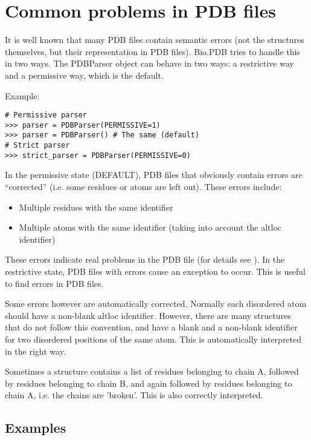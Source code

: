 \section{Common problems in PDB files}

It is well known that many PDB files contain semantic errors (not the
structures themselves, but their representation in PDB files).
Bio.PDB tries to handle this in two ways. The PDBParser
object can behave in two ways: a restrictive way and a permissive
way, which is the default.

Example:

\begin{verbatim}
# Permissive parser
>>> parser = PDBParser(PERMISSIVE=1)
>>> parser = PDBParser() # The same (default)
# Strict parser
>>> strict_parser = PDBParser(PERMISSIVE=0)
\end{verbatim}
In the permissive state (DEFAULT), PDB files that obviously contain
errors are ``corrected'' (i.e. some residues or atoms are left out).
These errors include:

\begin{itemize}
\item Multiple residues with the same identifier
\item Multiple atoms with the same identifier (taking into account the altloc
identifier)
\end{itemize}
These errors indicate real problems in the PDB file (for details see
\cite[Hamelryck and Manderick, 2003]{hamelryck2003a}). In the restrictive state, PDB files with errors cause an exception to occur. This is useful to find errors in PDB files.

Some errors however are automatically corrected. Normally each disordered
atom should have a non-blank altloc identifier. However, there are
many structures that do not follow this convention, and have a blank
and a non-blank identifier for two disordered positions of the same
atom. This is automatically interpreted in the right way.

Sometimes a structure contains a list of residues belonging to chain
A, followed by residues belonging to chain B, and again followed by
residues belonging to chain A, i.e. the chains are 'broken'. This
is also correctly interpreted.

\subsection{Examples}
\label{sec:problem_structures}

